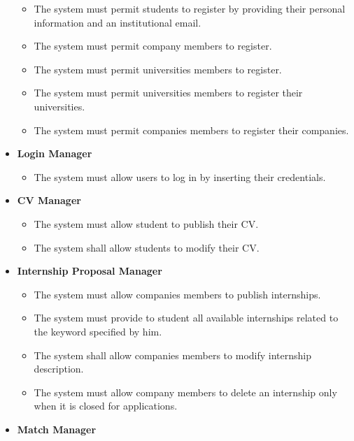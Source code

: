 \begin{itemize}
\begin{itemize}
        \item [\text{ [R1] }] The system must permit students to register by providing their personal information and an institutional email.
        \item [\text{ [R2] }] The system must permit company members to register.
        \item [\text{ [R3] }] The system must permit universities members to register.
        \item [\text{ [R4] }] The system must permit universities members to register their universities.
        \item [\text{ [R5] }] The system must permit companies members to register their companies.\\
    \end{itemize}
    \item \textbf{Login Manager}
    \begin{itemize}
        \item [\text{ [R6] }] The system must allow users to log in by inserting their credentials.\\
    \end{itemize}
    \item \textbf{CV Manager}
    \begin{itemize}
        \item [\text{ [R7] }] The system must allow student to publish their CV.
        \item [\text{ [R23] }] The system shall allow students to modify their CV.\\
    \end{itemize}
    \item \textbf{Internship Proposal Manager}
    \begin{itemize}
        \item [\text{ [R8] }] The system must allow companies members to publish internships.
        \item [\text{ [R20] }] The system must provide to student all available internships related to the keyword specified by him.
        \item [\text{ [R24] }] The system shall allow companies members to modify internship description.
        \item [\text{ [R33] }] The system must allow company members to delete an internship only when it is closed for applications.\\
    \end{itemize}
    \item \textbf{Match Manager}

\end{itemize}
